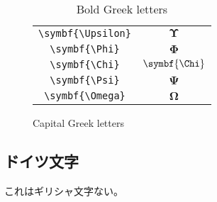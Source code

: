 \begin{table}[htbp]
\begin{subfigure}{.5\textwidth}
\begin{tabular}{cc}
            \verb|\symbf{\Upsilon}| & \(\symbf{\Upsilon}\) \\
            \verb|\symbf{\Phi}|     & \(\symbf{\Phi}\)     \\
            \verb|\symbf{\Chi}|     & \(\symbf{\Chi}\)     \\
            \verb|\symbf{\Psi}|     & \(\symbf{\Psi}\)     \\
            \verb|\symbf{\Omega}|   & \(\symbf{\Omega}\)   \\
            \bottomrule
        \end{tabular}
        \caption{Capital Greek letters}
        \label{fig:capital_greek}
    \end{subfigure}
    \caption{Bold Greek letters}
    \label{tab:bold_greek}
\end{table}

\subsection{ドイツ文字}

これはギリシャ文字ない。


